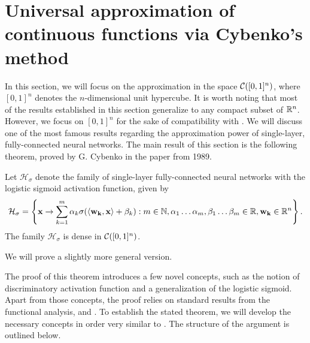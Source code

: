 \newpage
\section{Universal approximation of continuous functions via Cybenko's method}
\label{section:universality:continuous:cybenko}

In this section, we will focus on the approximation in the space ${\mathcal C}([0,1]^n)$, where $[0,1]^n$ denotes the $n$-dimensional unit hypercube. It is worth noting that most of the results established in this section generalize to any compact subset of ${\mathbb R}^n$. However, we focus on $[0,1]^n$ for the sake of compatibility with \cite{cybenko_1989_approximation}. We will discuss one of the most famous results regarding the approximation power of single-layer, fully-connected neural networks. The main result of this section is the following theorem, proved by G. Cybenko in the paper \cite{cybenko_1989_approximation} from 1989.
\begin{theorem*}[Cybenko, 1989]
Let $\mathcal{H}_{\sigma}$ denote the family of single-layer fully-connected neural networks with the logistic sigmoid activation function, given by \begin{align*}
\mathcal{H}_{\sigma} = \left \{ \mathbf{x} \to \sum_{k=1}^{m} \alpha_k \sigma{\left (\langle \mathbf{w_k}, \mathbf{x} \rangle + \beta_k \right)} : m \in {\mathbb N}, \alpha_1 \ldots \alpha_m , \beta_1 \ldots \beta_m \in {\mathbb R}, \mathbf{w_k} \in {\mathbb R}^n \right \}.
\end{align*}
The family $\mathcal{H}_{\sigma}$ is dense in ${\mathcal C}([0,1]^n)$.
\end{theorem*}
\begin{remark}
We will prove a slightly more general version.
\end{remark}

The proof of this theorem introduces a few novel concepts, such as the notion of discriminatory activation function and a generalization of the logistic sigmoid. Apart from those concepts, the proof relies on standard results from the functional analysis,  and . To establish the stated theorem, we will develop the necessary concepts in order very similar to \cite{cybenko_1989_approximation}. The structure of the argument is outlined below.

